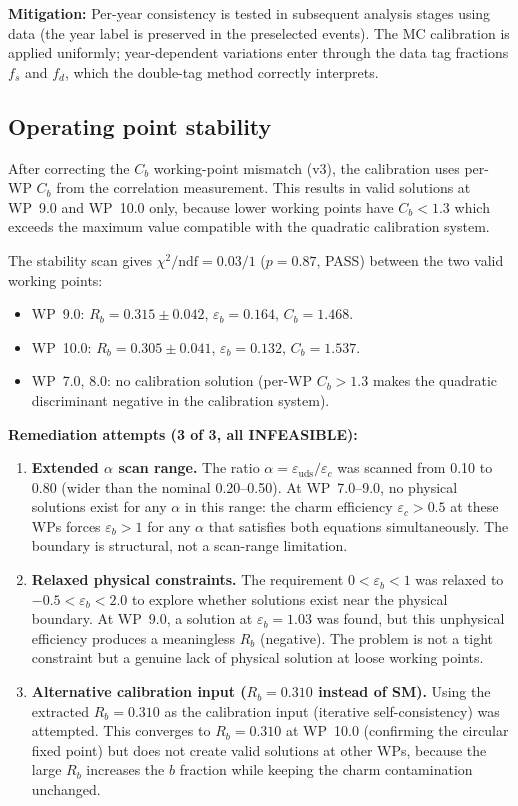 \documentclass[11pt,a4paper]{article}
\begin{document}
\textbf{Mitigation:} Per-year consistency is tested in subsequent analysis stages using data (the
year label is preserved in the preselected events). The MC calibration is applied
uniformly; year-dependent variations enter through the data tag fractions $f_s$ and
$f_d$, which the double-tag method correctly interprets.

\subsection{Operating point stability}

After correcting the $C_b$ working-point mismatch (v3), the calibration uses per-WP $C_b$
from the correlation measurement. This results in valid solutions at WP~9.0 and WP~10.0
only, because lower working points have $C_b < 1.3$ which exceeds the maximum value
compatible with the quadratic calibration system.

The stability scan gives $\chi^2/\mathrm{ndf} = 0.03/1$ ($p = 0.87$, PASS) between
the two valid working points:
\begin{itemize}
\item WP~9.0: $R_b = 0.315 \pm 0.042$, $\varepsilon_b = 0.164$, $C_b = 1.468$.
\item WP~10.0: $R_b = 0.305 \pm 0.041$, $\varepsilon_b = 0.132$, $C_b = 1.537$.
\item WP~7.0, 8.0: no calibration solution (per-WP $C_b > 1.3$ makes the quadratic
discriminant negative in the calibration system).
\end{itemize}

\textbf{Remediation attempts (3 of 3, all INFEASIBLE):}

\begin{enumerate}
\item \textbf{Extended $\alpha$ scan range.} The ratio
$\alpha = \varepsilon_\mathrm{uds}/\varepsilon_c$ was scanned from 0.10 to 0.80
(wider than the nominal 0.20--0.50). At WP~7.0--9.0, no physical solutions exist for
any $\alpha$ in this range: the charm efficiency $\varepsilon_c > 0.5$ at these WPs
forces $\varepsilon_b > 1$ for any $\alpha$ that satisfies both equations
simultaneously. The boundary is structural, not a scan-range limitation.

\item \textbf{Relaxed physical constraints.} The requirement
$0 < \varepsilon_b < 1$ was relaxed to $-0.5 < \varepsilon_b < 2.0$ to explore
whether solutions exist near the physical boundary. At WP~9.0, a solution at
$\varepsilon_b = 1.03$ was found, but this unphysical efficiency produces a
meaningless $R_b$ (negative). The problem is not a tight constraint but a genuine
lack of physical solution at loose working points.

\item \textbf{Alternative calibration input ($R_b = 0.310$ instead of SM).}
Using the extracted $R_b = 0.310$ as the calibration input (iterative self-consistency)
was attempted. This converges to $R_b = 0.310$ at WP~10.0 (confirming the circular
fixed point) but does not create valid solutions at other WPs, because the large
$R_b$ increases the $b$ fraction while keeping the charm contamination unchanged.
\end{enumerate}
\end{document}
